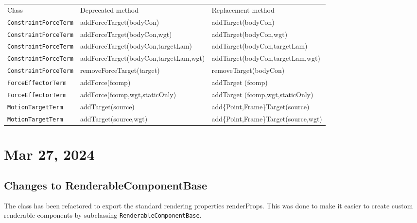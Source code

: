 \documentclass{article}
\begin{document}
%
\begin{center}
\begin{tabular}{lll}
\hline
Class & Deprecated method & Replacement method \\
\fi
\hline
{\tt ConstraintForceTerm} & 
addForceTarget(bodyCon) & addTarget(bodyCon) \\
{\tt ConstraintForceTerm} & 
addForceTarget(bodyCon,wgt) & addTarget(bodyCon,wgt) \\
{\tt ConstraintForceTerm} & 
addForceTarget(bodyCon,targetLam) & addTarget(bodyCon,targetLam) \\
{\tt ConstraintForceTerm} & 
addForceTarget(bodyCon,targetLam,wgt) & addTarget(bodyCon,targetLam,wgt) \\
{\tt ConstraintForceTerm} &
removeForceTarget(target) & removeTarget(bodyCon) \\
\hline
{\tt ForceEffectorTerm} &
addForce(fcomp) & addTarget (fcomp) \\
{\tt ForceEffectorTerm} &
addForce(fcomp,wgt,staticOnly) & addTarget (fcomp,wgt,staticOnly) \\
\hline
{\tt MotionTargetTerm} &
addTarget(source) & add\{Point,Frame\}Target(source) \\
{\tt MotionTargetTerm} &
addTarget(source,wgt) & add\{Point,Frame\}Target(source,wgt) \\
\hline
\end{tabular}
\end{center}

\section*{Mar 27, 2024}

\subsection*{Changes to RenderableComponentBase}

The class
 has been
refactored to export the standard rendering properties {\sf
renderProps}. This was done to make it easier to create custom
renderable components by subclassing {\tt RenderableComponentBase}.
\end{document}
